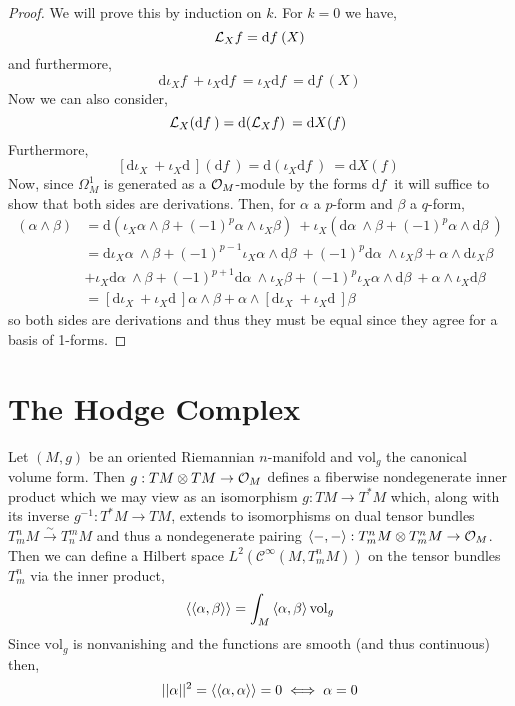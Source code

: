 \documentclass[12pt]{extarticle}
\renewcommand{\d}[1]{ \mathrm{d}#1 \:}
\theoremstyle{definition}
\newenvironment{definition}[1][Definition:]{\begin{trivlist}
\item[\hskip \labelsep {\bfseries #1}]}{\end{trivlist}}
\newcommand{\inner}[2]{\left< #1, #2 \right>}
\begin{document}
\begin{proof}
We will prove this by induction on $k$. For $k = 0$ we have,
\[ \L_X f = \d{f}(X) \]
and furthermore,
\[ \d{\iota_X f} + \iota_X \d{f} = \iota_X \d{f} = \d{f}(X) \]
Now we can also consider,
\[ \L_X (\d{f}) = \d{(\L_X f)} = \d{ X(f)} \]
Furthermore,
\[ [\d{\iota_X} + \iota_X \d{} ](\d{f}) = \d{(\iota_X \d{f})} = \d{X(f)} \] 
Now, since $\Omega^1_M$ is generated as a $\mathcal{O}_{M}$-module by the forms $\d{f}$ it will suffice to show that both sides are derivations. Then, for $\alpha$ a $p$-form and $\beta$ a $q$-form,
\begin{align*}
[\d{\iota_X} + \iota_X \d{} ](\alpha \wedge \beta) & = \d{\left( \iota_X \alpha \wedge \beta + (-1)^p \alpha \wedge \iota_X \beta \right)} + \iota_X {\left( \d{\alpha} \wedge \beta + (-1)^p \alpha \wedge \d{\beta} \right)}
\\
& = \d{\iota_X \alpha} \wedge \beta + (-1)^{p-1} \iota_X \alpha \wedge \d{\beta} + (-1)^p \d{\alpha} \wedge \iota_X \beta + \alpha \wedge \d{\iota_X \beta} 
\\
& + \iota_X \d{\alpha} \wedge \beta + (-1)^{p+1} \d{\alpha} \wedge \iota_X \beta + (-1)^p \iota_X \alpha \wedge \d{\beta} + \alpha \wedge \iota_X \d{\beta}
\\
& = [ \d{\iota_X} + \iota_X \d{} ] \alpha \wedge \beta + \alpha \wedge [ \d{\iota_X} + \iota_X \d{} ]  \beta 
\end{align*}
so both sides are derivations and thus they must be equal since they agree for a basis of 1-forms. 
\end{proof}

\section{The Hodge Complex}

\newcommand{\vol}{\mathrm{vol}}

\begin{definition}
Let $(M, g)$ be an oriented Riemannian $n$-manifold and $\vol_g$ the canonical volume form. Then $g : TM \otimes TM \to \mathcal{O}_{M}$ defines a fiberwise nondegenerate inner product which we may view as an isomorphism $g : TM \to T^*M$ which, along with its inverse $g^{-1} : T^*M \to TM$, extends to isomorphisms on dual tensor bundles $T^n_m M \xrightarrow{\sim} T^m_n M$ and thus a nondegenerate pairing $\inner{-}{-} : T^{n}_{m} M \otimes T^{n}_{m} M \to \struct{M}$.
\bigskip\\
Then we can define a Hilbert space $L^2(\mathcal{C}^\infty(M, T^n_m M))$ on the tensor bundles $T^n_m$ via the inner product,
\[ \Inner{\alpha}{\beta} = \int_M \inner{\alpha}{\beta} \vol_g \]
Since $\vol_g$ is nonvanishing and the functions are smooth (and thus continuous) then,
\[ ||\alpha||^2 = \left< \left< \alpha, \alpha \right> \right> = 0 \iff \alpha = 0 \]
 
\end{definition}
\end{document}
